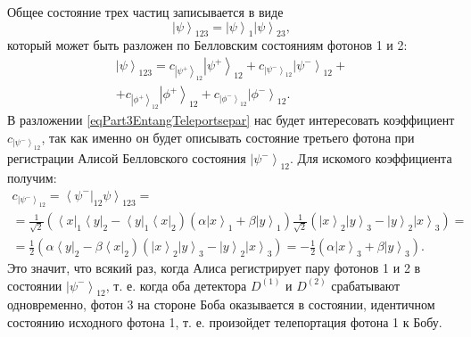 Общее состояние трех частиц записывается в виде
\begin{equation}
  \left|\psi\right>_{123} = \left|\psi\right>_1 \left|\psi\right>_{23},
  \nonumber
\end{equation}
который может быть разложен по Белловским состояниям фотонов 1 и 2:
\begin{eqnarray}
\left|\psi\right>_{123} = 
c_{\left|\psi^{+}\right>_{12}}\left|\psi^{+}\right>_{12} +
c_{\left|\psi^{-}\right>_{12}}\left|\psi^{-}\right>_{12} +
\nonumber \\
+
c_{\left|\phi^{+}\right>_{12}}\left|\phi^{+}\right>_{12} +
c_{\left|\phi^{-}\right>_{12}}\left|\phi^{-}\right>_{12}.
\label{eqPart3EntangTeleportsepar}
\end{eqnarray}
В разложении \eqref{eqPart3EntangTeleportsepar} нас будет интересовать
коэффициент 
$c_{\left|\psi^{-}\right>_{12}}$, так как именно он будет описывать
состояние третьего фотона при регистрации Алисой Белловского состояния 
$\left|\psi^{-}\right>_{12}$. Для искомого коэффициента получим:
\begin{eqnarray}
  c_{\left|\psi^{-}\right>_{12}} = 
  \left<\psi^{-}\right|_{12} \left.\psi\right>_{123} = 
  \nonumber \\
  =
  \frac{1}{\sqrt{2}}
  \left(
  \left<x\right|_1\left<y\right|_2 - 
  \left<y\right|_1\left<x\right|_2
  \right)
  \left(
  \alpha \left|x\right>_1 +
  \beta \left|y\right>_1
  \right)
  \frac{1}{\sqrt{2}}
  \left(
  \left|x\right>_2\left|y\right>_3 - 
  \left|y\right>_2\left|x\right>_3
  \right) = 
  \nonumber \\
  = \frac{1}{2}
  \left(
  \alpha\left<y\right|_2 - 
  \beta\left<x\right|_2
  \right)
  \left(
  \left|x\right>_2\left|y\right>_3 - 
  \left|y\right>_2\left|x\right>_3
  \right) = 
  - \frac{1}{2}  
  \left(
  \alpha \left|x\right>_3 +
  \beta \left|y\right>_3
  \right).
\nonumber
\end{eqnarray}
Это значит, что всякий раз, когда Алиса регистрирует пару фотонов 1 и 2
в состоянии $\left|\psi^{-}\right>_{12}$, т. е. когда оба детектора
$D^{(1)}$ и $D^{(2)}$ срабатывают одновременно, фотон 3 на стороне
Боба оказывается в состоянии, идентичном состоянию исходного фотона 1,
т. е. произойдет телепортация фотона 1  к Бобу.


